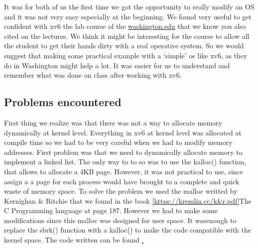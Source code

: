 \documentclass[10pt,a4]{article}
\begin{document}
It was for both of us the first time we got the opportunity to really modify an OS and it was not very easy especially at the beginning. We found very useful to get confident with xv6 the lab course of the \href{https://courses.cs.washington.edu/courses/csep551/19au/labs/}{washington.edu} that we know you also cited on the lectures. We think it might be interesting for the course to allow all the student to get their hands dirty with a real operative system. So we would suggest that making some practical example with a ‘simple’ os like xv6, as they do in Washington might  help a lot. It was easier for us to understand and remember what was done on class after working with xv6.
\subsection{Problems encountered}

First thing we realize was that there was not a way to allocate memory dynamically at kernel level. Everything in xv6 at kernel level was allocated at compile time so we had to be very careful when we had to modify memory addresses. First problem was that we need to dynamically allocate memory to implement a linked list. The only way to to so was to use the kalloc() function, that allows to allocate a 4KB page. However, it was not practical to use, since assign a a page for each process would have brought to a complete and quick waste of memory space. To solve the problem we used the malloc writted by Kernighan & Ritchie that we found in the book \ref{https://kremlin.cc/k&r.pdf}{The C Programming language} at page 187. However we had to make some modifications since this malloc was designed for user space. It wasenough to replace the sbrk() function with a kalloc() to make the code compatible with the kernel space. The code written can be found \href{link al codice}.
\end{document}

